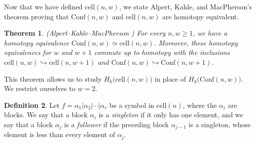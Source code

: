 \documentclass[12py]{amsart}%
\newtheorem{thm}{Theorem}[section]
\theoremstyle{definition}\newtheorem{definition}[thm]{Definition}
\theoremstyle{definition}
\newtheorem{defn}[thm]{Definition}
\newcommand{\Q}{\ensuremath{\mathbb{Q}}}
\begin{document}
Now that we have defined $\text{cell}(n,w)$, we state Alpert, Kahle, and MacPherson's theorem proving that $\text{Conf}(n,w)$ and $\text{cell}(n,w)$ are homotopy equivalent.

\begin{thm}\label{confiscell}
(Alpert--Kahle--MacPherson \cite[Theorem 3.1]{alpert2021configuration}) For every $n, w\ge 1$, we have a homotopy equivalence $\text{Conf}(n,w)\simeq \text{cell}(n,w)$. Moreover, these homotopy equivalences for $w$ and $w+1$ commute up to homotopy with the inclusions $\text{cell}(n,w)\hookrightarrow \text{cell}(n,w+1)$ and $\text{Conf}(n,w)\hookrightarrow \text{Conf}(n,w+1)$.
\end{thm}

This theorem allows us to study $H_{k}\big(\text{cell}(n,w)\big)$ in place of $H_{k}\big(\text{Conf}(n,w)\big)$. We restrict ourselves to $w=2$. %

\begin{defn}
Let $f=\alpha_{1}|\alpha_{2}|\cdots|\alpha_{r}$ be a symbol in $\text{cell}(n)$, where the $\alpha_{i}$ are blocks. We say that a block $\alpha_{i}$ is a \emph{singleton} if it only has one element, and we say that a block $\alpha_{j}$ is a \emph{follower} if the preceding block $\alpha_{j-1}$ is a singleton, whose element is less than every element of $\alpha_{j}$.
\end{defn}
\end{document}
